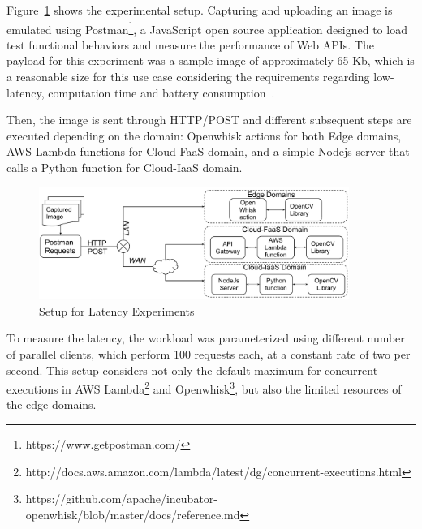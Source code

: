 Figure~\ref{fig:exp-setup1} shows the experimental setup. Capturing and uploading an image is emulated using Postman\footnote{https://www.getpostman.com/}, a JavaScript open source application designed to load test functional behaviors and measure the performance of Web APIs. The  payload for this experiment was a sample image of approximately 65 Kb, which is a reasonable size for this use case considering the requirements regarding low-latency, computation time and battery consumption~\cite{rodriguez16mobile}. 

Then, the image is sent through HTTP/POST and different subsequent steps are executed depending on the domain: Openwhisk actions for both Edge domains, AWS Lambda functions for Cloud-FaaS domain, and a simple Nodejs server that calls a Python function for Cloud-IaaS domain.



\begin{figure}
	
	\centering
	\includegraphics[width=0.9\textwidth]{figs/experimental-setup.pdf}
	\caption{Setup for Latency Experiments}
	\label{fig:exp-setup1}
\end{figure}


To measure the latency, the workload was parameterized using different number of parallel clients, which perform 100 requests each, at a constant rate of two per second. This setup considers not only the default maximum for concurrent executions in AWS Lambda\footnote{http://docs.aws.amazon.com/lambda/latest/dg/concurrent-executions.html} and Openwhisk\footnote{https://github.com/apache/incubator-openwhisk/blob/master/docs/reference.md}, but also the limited resources of the edge domains. 

